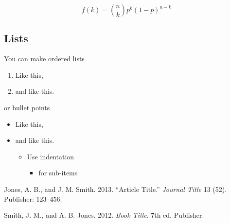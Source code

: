 \documentclass[9pt,a4paper,]{extarticle}
\begin{document}
\begin{equation}
  f\left(k\right) = \binom{n}{k} p^k\left(1-p\right)^{n-k}
  \label{eq:binom}
\end{equation}

\subsection{Lists}\label{lists}

You can make ordered lists

\begin{enumerate}
\def\labelenumi{\arabic{enumi}.}
\item
  Like this,
\item
  and like this.
\end{enumerate}

or bullet points

\begin{itemize}
\item
  Like this,
\item
  and like this.

  \begin{itemize}
  \item
    Use indentation

    \begin{itemize}
    \item
      for sub-items
    \end{itemize}
  \end{itemize}
\end{itemize}

\hypertarget{refs}{}
\hypertarget{ref-Smith:2013jd}{}
Jones, A. B., and J. M. Smith. 2013. ``Article Title.'' \emph{Journal
Title} 13 (52). Publisher: 123--456.

\hypertarget{ref-Smith:2012qr}{}
Smith, J. M., and A. B. Jones. 2012. \emph{Book Title}. 7th ed.
Publisher.
\end{document}
